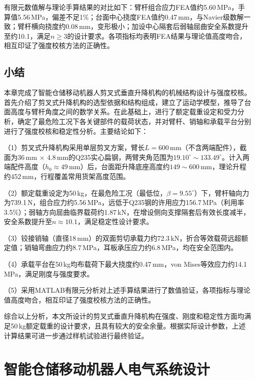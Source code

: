 {{有限元数值解与理论手算结果的对比如下：臂杆组合应力FEA值约5.60\,MPa，手算值5.56\,MPa，偏差不足1\%；台面中心挠度FEA值约0.47\,mm，与Navier级数解一致；臂杆横向挠度约0.08\,mm，变形极小；加设中心隔套后弱轴屈曲安全系数提升至约10.1，满足$n\geq3$的设计要求。各项指标均表明FEA结果与理论值高度吻合，相互印证了强度校核方法的正确性。}

\section{小结}
本章完成了智能仓储移动机器人剪叉式垂直升降机构的机械结构设计与强度校核。首先介绍了剪叉式升降机构的选型依据和结构组成，建立了运动学模型，推导了台面高度与臂杆角度之间的数学关系。在此基础上，进行了额定载重设定和受力分析，确定了最危险工况下各关键部件的载荷状态，并对臂杆、销轴和承载平台分别进行了强度校核和稳定性分析。主要结论如下：

（1）剪叉式升降机构采用单层剪叉方案，臂长$L = 600$\,mm（不含两端配件），截面为36\,mm $\times$ 4.8\,mm的Q235实心扁钢，两臂夹角范围为$19.10^{\circ} \sim 133.49^{\circ}$。计入两端配件高度（$h_0 \approx 49$\,mm）后，台面距升降底座高度约$149 \sim 600$\,mm，理论升程约452\,mm，行程覆盖常用货架高度范围。

（2）额定载重设定为50\,kg，在最危险工况（最低位，$\beta = 9.55^{\circ}$）下，臂杆轴向力为739.1\,N，组合应力约5.56\,MPa，远低于Q235钢的许用应力156.7\,MPa（利用率3.5\%）；弱轴方向屈曲临界载荷约1.87\,kN，在增设侧向支撑隔套后有效长度减半，安全系数提升至$n \approx 10.1$，满足稳定性设计要求。

（3）铰接销轴（直径18\,mm）的双面剪切承载力约72.3\,kN，折合等效载荷远超额定值；销轴弯曲应力约8.7\,MPa，耳板承压应力约6.8\,MPa，均在安全范围内。

（4）承载平台在50\,kg均布载荷下最大挠度约0.47\,mm，von Mises等效应力约14.1\,MPa，满足刚度与强度要求。

（5）采用MATLAB有限元分析对上述手算结果进行了数值验证，各项指标与理论值高度吻合，相互印证了强度校核方法的正确性。

综合以上分析，本文所设计的剪叉式垂直升降机构在强度、刚度和稳定性方面均满足50\,kg额定载重的设计要求，且具有较大的安全余量。根据实际设计参数，上述计算结果可进一步通过样机试验进行最终验证。

\chapter{智能仓储移动机器人电气系统设计}
}
